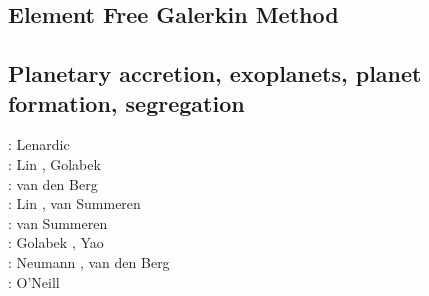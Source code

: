 \subsection{Element Free Galerkin Method}

\begin{scriptsize}
\cite{begl94b}
\cite{belg95a}
\cite{belg95b}
\cite{bekf96}\cite{como96}
\cite{bekk97}
\cite{pobe98}\cite{zhat98}
\cite{hans03}\cite{katf04}
\cite{huvv04}
\cite{yiha10}\cite{libe10}
\end{scriptsize}

\subsection{Planetary accretion, exoplanets, planet formation, segregation}

\begin{scriptsize}
\twothousandeight: Lenardic \etal \cite{lejm08} \\
\twothousandnine: Lin \etal \cite{ligt09}, Golabek \etal \cite{gogk09}\\
\twothousandten: van den Berg \etal \cite{vayb10}\\
\twothousandeleven: Lin \etal \cite{ligt11}, van Summeren \etal \cite{vacg11}\\
\twothousandthirteen: van Summeren \etal \cite{vagc13}\\
\twothousandfourteen: Golabek \etal \cite{gobg14}, Yao \etal \cite{yadl14}\\
\twothousandnineteen: Neumann \cite{neum19}, van den Berg \etal \cite{vayu19}\\
\twothousandtwenty: O'Neill \etal \cite{onlw20}
\end{scriptsize}

